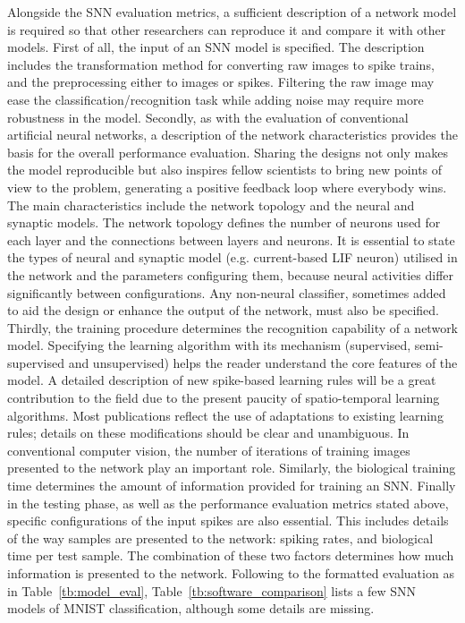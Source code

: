 Alongside the SNN evaluation metrics, a sufficient description of a network model is required so that other researchers can reproduce it and compare it with other models.
First of all, the input of an SNN model is specified.
The description includes the transformation method for converting raw images to spike trains, and the preprocessing either to images or spikes.
Filtering the raw image may ease the classification/recognition task while adding noise may require more robustness in the model.
Secondly, as with the evaluation of conventional artificial neural networks, a description of the network characteristics provides the basis for the overall performance evaluation.
Sharing the designs not only makes the model reproducible but also inspires fellow scientists to bring new points of view to the problem, generating a positive feedback loop where everybody wins.
The main characteristics include the network topology and the neural and synaptic models.
The network topology defines the number of neurons used for each layer and the connections between layers and neurons.
It is essential to state the types of neural and synaptic model (e.g. current-based LIF neuron) utilised in the network and the parameters configuring them, because neural activities differ significantly between configurations.
Any non-neural classifier, sometimes added to aid the design or enhance the output of the network, must also be specified.
Thirdly, the training procedure determines the recognition capability of a network model.
Specifying the learning algorithm with its mechanism (supervised, semi-supervised and unsupervised) helps the reader understand the core features of the model.
A detailed description of new spike-based learning rules will be a great contribution to the field due to the present paucity of spatio-temporal learning algorithms.
Most publications reflect the use of adaptations to existing learning rules; details on these modifications should be clear and unambiguous.
In conventional computer vision, the number of iterations of training images presented to the network play an important role.
Similarly, the biological training time determines the amount of information provided for training an SNN.
Finally in the testing phase, as well as the performance evaluation metrics stated above, specific configurations of the input spikes are also essential.
This includes details of the way samples are presented to the network: spiking rates, and biological time per test sample.
The combination of these two factors determines how much information is presented to the network.
Following to the formatted evaluation as in Table~\ref{tb:model_eval}, Table~\ref{tb:software_comparison} lists a few SNN models of MNIST classification, although some details are missing. 

